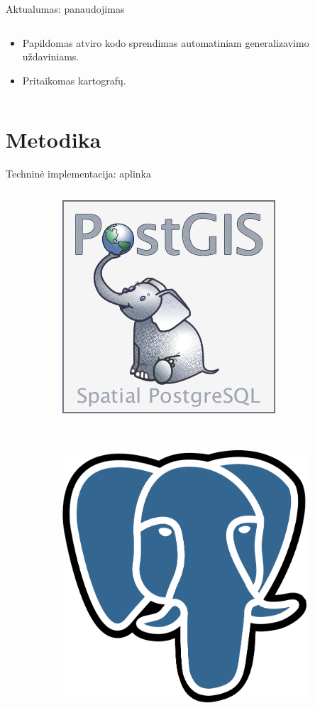 \documentclass[14pt]{beamer}
\begin{document}
\begin{frame}{Aktualumas: panaudojimas}
\begin{columns}[c]
\begin{column}{.7\textwidth}
\begin{itemize}
        \item Papildomas atviro kodo sprendimas automatiniam generalizavimo
          uždaviniams.

        \item Pritaikomas kartografų.

      \end{itemize}
    \end{column}
  \end{columns}
\end{frame}


\section{Metodika}

\begin{frame}{Techninė implementacija: aplinka}
  \begin{columns}[c]
    \begin{column}{.3\textwidth}
      \begin{figure}[ht]
        \begin{subfigure}[b]{\textwidth}
          \centering
          \includegraphics[width=.7\textwidth]{postgis-logo}
        \end{subfigure}
        \\[1ex]
        \begin{subfigure}[b]{\textwidth}
          \centering
          \includegraphics[width=.5\textwidth]{postgresql-logo}

\end{subfigure}
\end{figure}
\end{column}
\end{columns}
\end{frame}
\end{document}
